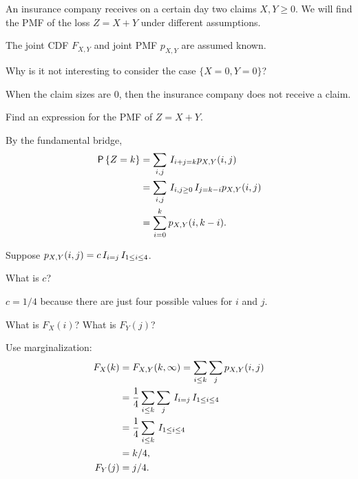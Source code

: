 An insurance company receives on a certain day two claims $X, Y \geq 0$.
We will find the PMF of the loss $Z=X+Y$ under different assumptions.

The joint CDF $F_{X,Y}$ and joint PMF $p_{X,Y}$ are assumed known.

\begin{exercise}
Why is it not interesting to consider the case $\{X=0, Y=0\}$?
\begin{solution}
When the claim sizes are $0$, then the insurance company does not receive a claim.
\end{solution}
\end{exercise}


\begin{exercise}
Find an expression for the PMF of $Z=X+Y$.
\begin{solution}
By the fundamental bridge,
\begin{align}
  \label{}
\,\mathsf{P}\left\{Z=k\right\}
&= \sum_{i,j} \,I_{i+j=k} p_{X,Y}(i,j) \\
&= \sum_{i,j} \,I_{i, j \geq 0} \,I_{j=k-i} p_{X,Y}(i,j) \\
&= \sum_{i=0}^{k} p_{X,Y}(i,k-i).
\end{align}
\end{solution}
\end{exercise}

Suppose $p_{X,Y}(i,j) = c \,I_{i=j}\,I_{1\leq i \leq 4}$.


\begin{exercise}
What is $c$?
\begin{solution}
$c=1/4$ because there are just four possible values for $i$ and $j$.
\end{solution}
\end{exercise}

\begin{exercise}
What is $F_{X}(i)$?
What is $F_{Y}(j)$?
\begin{solution}
Use marginalization:
\begin{align}
F_X(k) &=  F_{X,Y}(k, \infty ) = \sum_{i\leq k} \sum_j p_{X,Y}(i,j) \\
 &= \frac{1}{4}\sum_{i\leq k} \sum_j \,I_{i=j}\,I_{1\leq i \leq 4}\\
 &= \frac{1}{4}\sum_{i\leq k} \,I_{1\leq i \leq 4} \\
&=k/4,\\
F_Y(j) &= j/4.
\end{align}
\end{solution}
\end{exercise}


